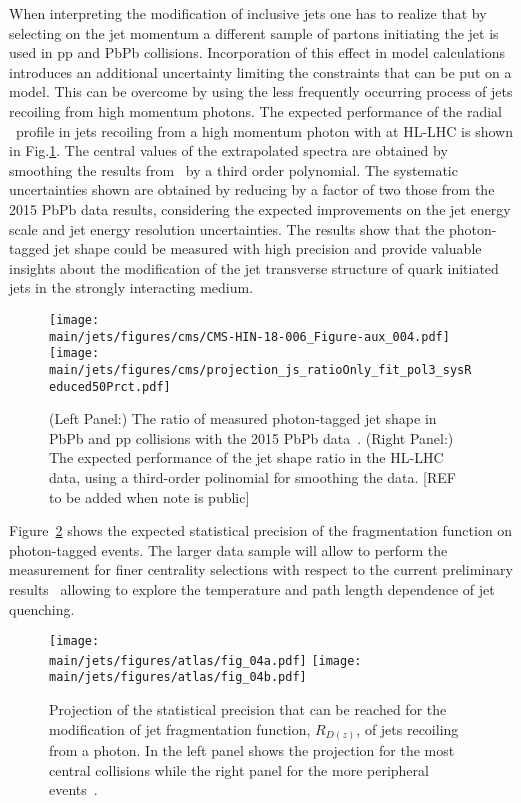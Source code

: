 When interpreting the modification of inclusive jets one has to realize that by selecting on the jet momentum a different sample of partons initiating the jet is used in pp and PbPb collisions. Incorporation of this effect in model calculations introduces an additional uncertainty limiting the constraints that can be put on a model. This can be overcome by using the less frequently occurring process of jets recoiling from high momentum photons. The expected performance of the radial \pT\ profile in jets recoiling from a high momentum photon with at HL-LHC is shown in Fig.\ref{fig:jetshape}. The central values of the extrapolated spectra are obtained by smoothing the results from~\cite{Sirunyan:2018ncy} by a third order polynomial. The systematic uncertainties shown are obtained by reducing by a factor of two those from the 2015 PbPb data results, considering the expected improvements on the jet energy scale and jet energy resolution uncertainties. The results show that the photon-tagged jet shape could be measured with high precision and provide valuable insights about the modification of the jet transverse structure of quark initiated jets in the strongly interacting medium.
%
\begin{figure}[!ht]
\begin{center}
\texttt{[image: \\main/jets/figures/cms/CMS-HIN-18-006\_Figure-aux\_004.pdf]}
\texttt{[image: \\main/jets/figures/cms/projection\_js\_ratioOnly\_fit\_pol3\_sysReduced50Prct.pdf]}
\caption{(Left Panel:) The ratio of measured photon-tagged jet shape in PbPb and pp collisions with the 2015 PbPb data~\cite{Sirunyan:2018ncy}. (Right Panel:) The expected performance of the jet shape ratio in the HL-LHC data, using a third-order polinomial for smoothing the data. [REF to be added when note is public]}
\label{fig:jetshape}
\end{center}
\end{figure}
%
Figure~\ref{fig:jetDzPh} shows the expected statistical precision of the fragmentation function on photon-tagged events. The larger data sample will allow to perform the measurement for finer centrality selections with respect to the current preliminary results~\cite{ATLAS-CONF-2017-074} allowing to explore the temperature and path length dependence of jet quenching. 
\begin{figure}[!ht]
\begin{center}
\texttt{[image: \\main/jets/figures/atlas/fig\_04a.pdf]}
\texttt{[image: \\main/jets/figures/atlas/fig\_04b.pdf]}
\caption{Projection of the statistical precision that can be reached for the modification of jet fragmentation function, $R_{D(z)}$, of jets recoiling from a photon. In the left panel shows the projection for the most central collisions while the right panel for the more peripheral events~\cite{ATL-PHYS-PUB-2018-019}.}
\label{fig:jetDzPh}
\end{center}
\end{figure}



